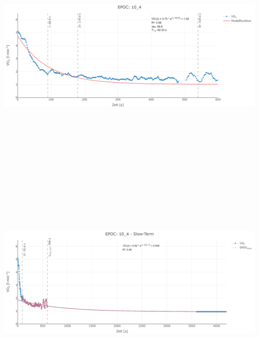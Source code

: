 \documentclass[
  letterpaper,
  DIV=11]{scrartcl}
\begin{document}
\includegraphics[width=11.45833in,height=4.6875in]{images/10_4_tau.png}
\includegraphics[width=11.45833in,height=4.6875in]{images/10_4_slow.png}
\end{document}

